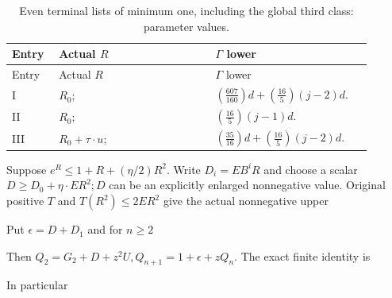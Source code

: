 \begingroup\small
\setlength{\tabcolsep}{3pt}
\setlength{\LTleft}{0pt}\setlength{\LTright}{\fill}
\begin{longtable}{@{}p{0.1200\linewidth}p{0.4000\linewidth}p{0.4000\linewidth}@{}}
\caption{Even terminal lists of minimum one, including the global third class: parameter values.}\label{tab:parameters:r2-c028:3}\\
\toprule
Entry & Actual \(R\) & \(\Gamma\) lower \\
\midrule\endfirsthead
\toprule
Entry & Actual \(R\) & \(\Gamma\) lower \\
\midrule\endhead
\bottomrule\endfoot
I & \(R_0\); & \((\frac{607}{160})d+(\frac{16}{5})(j-2)d\). \\
\addlinespace[2pt]
II & \(R_0\); & \((\frac{16}{5})(j-1)d\). \\
\addlinespace[2pt]
III & \(R_0+\tau\cdot u\); & \((\frac{35}{16})d+(\frac{16}{5})(j-2)d\). \\
\end{longtable}
\endgroup


Suppose \(e^R\le 1+R+(\eta/2)R^2\). Write \(D_i=E B^iR\) and choose a scalar \(D\ge D_0+\eta\cdot ER^2; D\) can be an explicitly enlarged nonnegative value. Original positive \(T\) and \(T(R^2)\le 2ER^2\) give the actual nonnegative upper


Put \(\epsilon=D+D_1\) and for \(n\ge 2\)


Then \(Q_{2}=G_{2}+D+z^2U,\allowbreak \allowbreak  Q_{n+1}=1+\epsilon+zQ_n\). The exact finite identity is


In particular


